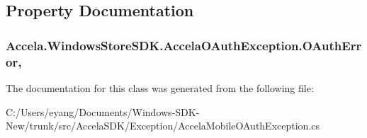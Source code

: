 \subsection{Property Documentation}
\hypertarget{class_accela_1_1_windows_store_s_d_k_1_1_accela_o_auth_exception_a68c76a9c52f9a60181a61e40bd3ca6d0}{
\subsubsection[{O\+Auth\+Error}]{ Accela.\+Windows\+Store\+S\+D\+K.\+Accela\+O\+Auth\+Exception.\+O\+Auth\+Error\hspace{0.3cm}{\ttfamily [get]}, {\ttfamily [set]}}}\label{class_accela_1_1_windows_store_s_d_k_1_1_accela_o_auth_exception_a68c76a9c52f9a60181a61e40bd3ca6d0}






The documentation for this class was generated from the following file\+:\begin{DoxyCompactItemize}
\item 
C\+:/\+Users/eyang/\+Documents/\+Windows-\/\+S\+D\+K-\/\+New/trunk/src/\+Accela\+S\+D\+K/\+Exception/Accela\+Mobile\+O\+Auth\+Exception.\+cs\end{DoxyCompactItemize}
